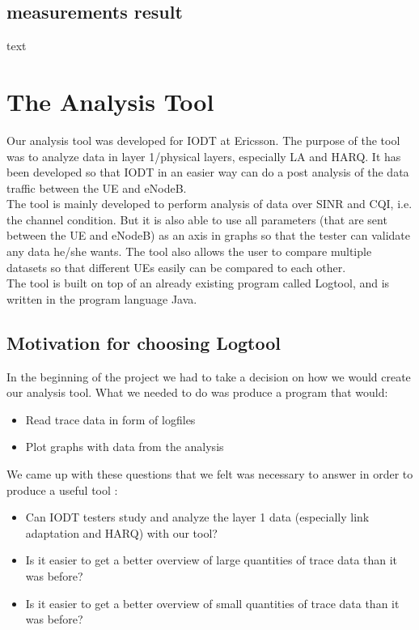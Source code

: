 \documentclass[cropmarks, frame, english]{idamasterthesis}
\begin{document}
\section{measurements result}
text













\chapter{The Analysis Tool} %
Our analysis tool was developed for IODT at Ericsson. The purpose of the tool was to analyze data in layer 1/physical layers, especially LA and HARQ. It has been developed so that IODT in an easier way can do a post analysis of the data traffic between the UE and eNodeB. \\


The tool is mainly developed to perform analysis of data over SINR and CQI, i.e. the channel condition. But it is also able to use all parameters (that are sent between the UE and eNodeB) as an axis in graphs so that the tester can validate any data he/she wants. The tool also allows the user to compare multiple datasets so that different UEs easily can be compared to each other. \\

The tool is built on top of an already existing program called Logtool, and is written in the program language Java. 

\section{Motivation for choosing Logtool}
In the beginning of the project we had to take a decision on how we would create our analysis tool.
What we needed to do was produce a program that would:
\begin{itemize}
\item Read trace data in form of logfiles%
\item Plot graphs with data from the analysis
\end{itemize}

We came up with these questions that we felt was necessary to answer in order to produce a useful tool :
\begin{itemize}
\item Can IODT testers study and analyze the layer 1 data (especially link adaptation and HARQ) with our tool?
\item Is it easier to get a better overview of large quantities of trace data than it was before?
\item Is it easier to get a better overview of small quantities of trace data than it was before?
\end{itemize}
\end{document}

